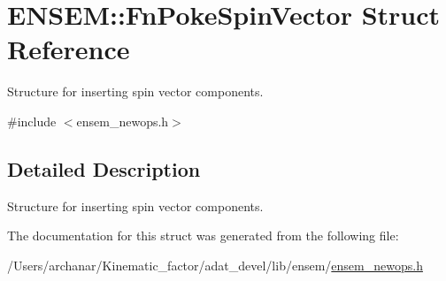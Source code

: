 \hypertarget{structENSEM_1_1FnPokeSpinVector}{}\section{E\+N\+S\+EM\+:\+:Fn\+Poke\+Spin\+Vector Struct Reference}
\label{structENSEM_1_1FnPokeSpinVector}


Structure for inserting spin vector components.  




{\ttfamily \#include $<$ensem\+\_\+newops.\+h$>$}



\subsection{Detailed Description}
Structure for inserting spin vector components. 

The documentation for this struct was generated from the following file\+:\begin{DoxyCompactItemize}
\item 
/\+Users/archanar/\+Kinematic\+\_\+factor/adat\+\_\+devel/lib/ensem/\mbox{\hyperlink{lib_2ensem_2ensem__newops_8h}{ensem\+\_\+newops.\+h}}\end{DoxyCompactItemize}
